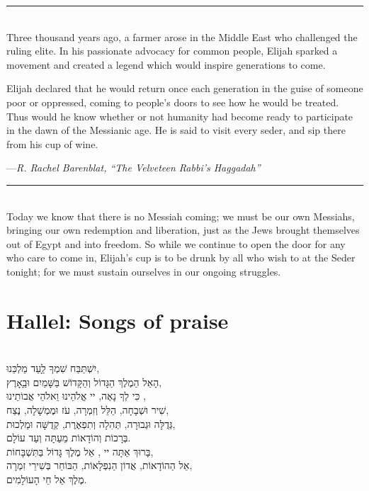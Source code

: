\documentclass[a4paper,10pt,openany]{memoir}
\newcommand{\HgInst}[1]{{\noindent\sffamily{\bfseries{#1}}}}
\newcommand{\HgSource}[1]{\hfill{\small---\itshape{#1}}}
\newcommand{\HgFill}{\vfill \hrule \vfill}
\newenvironment{HgEnglish}{\strut\\\noindent}{\vspace{1em}}
\newenvironment{HgHebrew}{\begin{hebrew}\strut\\\noindent\Large}{\end{hebrew}}
\newcommand{\SSrc}{\textsuperscript{\upshape{[S]}}}
\begin{document}
\HgFill

\begin{HgEnglish}
Three thousand years ago, a farmer arose in the Middle East who challenged the
ruling elite. In his passionate advocacy for common people, Elijah sparked a
movement and created a legend which would inspire generations to come.

Elijah declared that he would return once each generation in the guise of
someone poor or oppressed, coming to people's doors to see how he would be
treated. Thus would he know whether or not humanity had become ready to
participate in the dawn of the Messianic age. He is said to visit every seder,
and sip there from his cup of wine.

\HgSource{R. Rachel Barenblat, ``The Velveteen Rabbi's Haggadah''}
\end{HgEnglish}


\HgFill

\begin{HgEnglish}
  Today we know that there is no Messiah coming; we must be our own Messiahs,
  bringing our own redemption and liberation, just as the Jews brought
  themselves out of Egypt and into freedom. So while we continue to open the
  door for any who care to come in, Elijah’s cup is to be drunk by all who wish
  to at the Seder tonight; for we must sustain ourselves in our ongoing
  struggles. \SSrc
\end{HgEnglish}


\chapter*{Hallel: Songs of praise}

\HgInst{Read from the facing page. Then recite:}

\begin{HgHebrew}
  יִשְׁתַּבַּח שִׁמְךָ לַָעַד מַלְכֵּנוּ,  \\
  הָאֵל הַמֶלֶךְ הַגָּדוֹל וְהַקָּדוֹשׁ בַּשָּׁמַיִם וּבַָאָרֶץ, \\
  כִּי לְךָ נָאֶה, יי אֱלֹהֵינוּ וֵאלֹהֵי אֲבוֹתֵינוּ ,  \\
  שִׁיר וּשְׁבָחָה, הַלֵּל וְזִמְרָה, עֹז וּמֶמְשָׁלָה, נֶצַח,  \\
  גְּדֻלָּה וּגְבוּרָה, תְּהִלָה וְתִפְאֶרֶת, קְדֻשָּׁה וּמַלְכוּת, \\
  בְּרָכוֹת וְהוֹדָאוֹת מֵעַתָּה וְעַד עוֹלָם.  \\
  בָּרוּךְ אַתָּה יי , אֵל מֶלֶךְ גָּדוֹל בַּתִּשְׁבָּחוֹת,  \\
  אֵל הַהוֹדָאוֹת, אֲדוֹן הַנִפְלָאוֹת, הַבּוֹחֵר בְּשִׁירֵי זִמְרָה,  \\
  מֶלֶךְ אֵל חֵי הָעוֹלָמִים. 
\end{HgHebrew}
\end{document}
